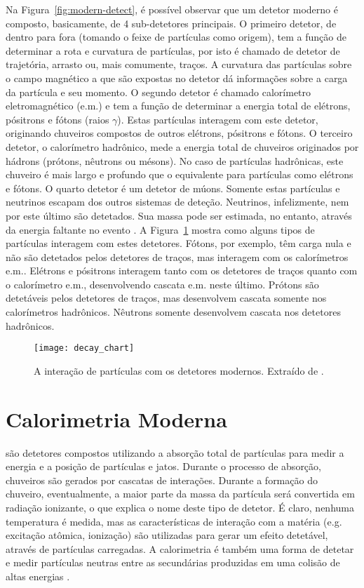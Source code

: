 Na Figura~\ref{fig:modern-detect}, é possível observar que um detetor moderno
é composto, basicamente, de 4 sub-detetores principais. O primeiro detetor, de
dentro para fora (tomando o feixe de partículas como origem), tem a função de
determinar a rota e curvatura de partículas, por isto é chamado de detetor de
trajetória, arrasto ou, mais comumente, traços. A curvatura das partículas
sobre o campo magnético a que são expostas no detetor dá informações sobre a
carga da partícula e seu momento. O segundo detetor é chamado calorímetro
eletromagnético (e.m.) e tem a função de determinar a energia total de
elétrons, pósitrons e fótons (raios $\gamma$). Estas partículas interagem com
este detetor, originando chuveiros compostos de outros elétrons, pósitrons e
fótons. O terceiro detetor, o calorímetro hadrônico, mede a energia total de
chuveiros originados por hádrons (prótons, nêutrons ou mésons). No caso de
partículas hadrônicas, este chuveiro é mais largo e profundo que o equivalente
para partículas como elétrons e fótons. O quarto detetor é um detetor de
múons. Somente estas partículas e neutrinos escapam dos outros sistemas de
deteção. Neutrinos, infelizmente, nem por este último são detetados. Sua massa
pode ser estimada, no entanto, através da energia faltante no evento
\cite{atlas-tp}. A Figura~\ref{fig:decay} mostra como alguns tipos de
partículas interagem com estes detetores. Fótons, por exemplo, têm carga nula
e não são detetados pelos detetores de traços, mas interagem com os
calorímetros e.m.. Elétrons e pósitrons interagem tanto com os detetores de
traços quanto com o calorímetro e.m., desenvolvendo cascata e.m. neste
último. Prótons são detetáveis pelos detetores de traços, mas desenvolvem
cascata somente nos calorímetros hadrônicos. Nêutrons somente desenvolvem
cascata nos detetores hadrônicos.

\begin{figure}
\begin{center}
\texttt{[image: decay\_chart]}
\end{center}
\caption{A interação de partículas com os detetores modernos. Extraído de
\cite{partadv}.} 
\label{fig:decay}
\end{figure}

\section{Calorimetria Moderna}
\label{sec:calorimetria}

 são detetores compostos utilizando a absorção
total de partículas para medir a energia e a posição de partículas e
jatos. Durante o processo de absorção, chuveiros são gerados por cascatas de
interações. Durante a formação do chuveiro, eventualmente, a maior parte da
massa da partícula será convertida em radiação ionizante, o que explica o nome
deste tipo de detetor. É claro, nenhuma temperatura é medida, mas as
características de interação com a matéria (e.g. excitação atômica, ionização)
são utilizadas para gerar um efeito detetável, através de partículas
carregadas. A calorimetria é também uma forma de detetar e medir partículas
neutras entre as secundárias produzidas em uma colisão de altas energias
\cite{bock:detector}.

